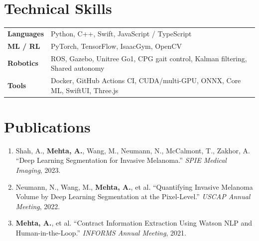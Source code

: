 \documentclass[10pt]{article}
\begin{document}
\section*{Technical Skills}
\begin{tabular}{@{}p{0.9in}l}
\textbf{Languages} & Python, C++, Swift, JavaScript / TypeScript \\
\textbf{ML / RL} & PyTorch, TensorFlow, IsaacGym, OpenCV \\
\textbf{Robotics} & ROS, Gazebo, Unitree Go1, CPG gait control, Kalman filtering, Shared autonomy \\
\textbf{Tools} & Docker, GitHub Actions CI, CUDA/multi-GPU, ONNX, Core ML, SwiftUI, Three.js \\
\end{tabular}

\section*{Publications}
\begin{enumerate}[leftmargin=1.4em,itemsep=1pt,topsep=1pt]
\item Shah, A., \textbf{Mehta, A.}, Wang, M., Neumann, N., McCalmont, T., Zakhor, A. ``Deep Learning Segmentation for Invasive Melanoma.'' \textit{SPIE Medical Imaging}, 2023.
\item Neumann, N., Wang, M., \textbf{Mehta, A.}, et al. ``Quantifying Invasive Melanoma Volume by Deep Learning Segmentation at the Pixel-Level.'' \textit{USCAP Annual Meeting}, 2022.
\item \textbf{Mehta, A.}, et al. ``Contract Information Extraction Using Watson NLP and Human-in-the-Loop.'' \textit{INFORMS Annual Meeting}, 2021.
\end{enumerate}
\end{document}
